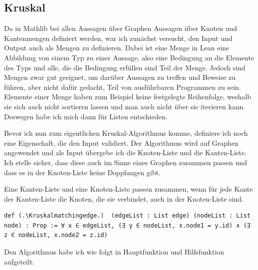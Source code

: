 \subsection{Kruskal}
Da in Mathlib bei allen Aussagen über Graphen Aussagen über Knoten und Kantenmengen definiert werden, war ich zunächst versucht, den Input und Output auch als Mengen zu definieren.
Dabei ist eine Menge in Lean eine Abbildung von einem Typ zu einer Aussage, also eine Bedingung an die Elemente des Typs und alle, die die Bedingung erfüllen sind Teil der Menge.
Jedoch sind Mengen zwar gut geeignet, um darüber Aussagen zu treffen und Beweise zu führen,
aber nicht dafür gedacht, Teil von ausführbaren Programmen zu sein.
Elemente einer Menge haben zum Beispiel keine festgelegte Reihenfolge, weshalb sie sich auch nicht sortieren lassen und man auch nicht über sie iterieren kann.
Deswegen habe ich mich dann für Listen entschieden.

Bevor ich nun zum eigentlichen Kruskal-Algorithmus komme, definiere ich noch eine Eigenschaft, die den Input validiert.
Der Algorithmus wird auf Graphen angewendet und als Input übergebe ich die Knoten-Liste und die Kanten-Liste.
Ich stelle sicher, dass diese auch im Sinne eines Graphen zusammen passen und dass es in der Knoten-Liste keine Dopplungen gibt.

\begin{definition}[\Kruskalmatchingedge]\label{Kruskalmatchingedge}
  Eine Kanten-Liste und eine Knoten-Liste passen zusammen, wenn für jede Kante der Kanten-Liste die Knoten, die sie verbindet, auch in der Knoten-Liste sind.
\end{definition}
\begin{lstlisting}
def (.\Kruskalmatchingedge.)  (edgeList : List edge) (nodeList : List node) : Prop := ∀ x ∈ edgeList, (∃ y ∈ nodeList, x.node1 = y.id) ∧ (∃ z ∈ nodeList, x.node2 = z.id)
\end{lstlisting}

Den Algorithmus habe ich wie folgt in Hauptfunktion und Hilfsfunktion aufgeteilt.

